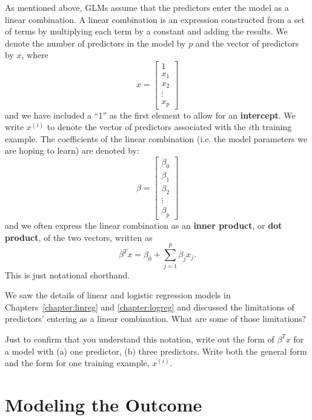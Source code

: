 As mentioned above, GLMs assume that the predictors enter the model as a linear combination. A linear combination is an expression constructed from a set of terms by multiplying each term by a constant and adding the results. We denote the number of predictors in the model by $p$ and the vector of predictors by $x$, where
$$ x = \begin{bmatrix}
1 \\
           x_{1} \\
           x_{2} \\
           \vdots \\
           x_{p}
         \end{bmatrix} $$
and we have included a ``1'' as the first element to allow for an \textbf{intercept}. We write $x^{(i)}$ to denote the vector of predictors associated with the $i$th training example. The coefficients of the linear combination (i.e. the model parameters we are hoping to learn) are denoted by:
$$ \beta = \begin{bmatrix}
\beta_0 \\
           \beta_{1} \\
           \beta_{2} \\
           \vdots \\
           \beta_{p}
         \end{bmatrix} $$
and we often express the linear combination as an \textbf{inner product}, or \textbf{dot product}, of the two vectors, written as
$$ \beta^T x = \beta_0 + \sum_{j=1}^p \beta_j x_j. $$
This is just notational shorthand. 
\vspace{3mm}

\begin{question}{}
We saw the details of linear and logistic regression models in Chapters~\ref{chapter:linreg} and \ref{chapter:logreg} and discussed the limitations of predictors' entering as a linear combination. What are some of those limitations?
\end{question}

\begin{question}{}
Just to confirm that you understand this notation, write out the form of $\beta^Tx$ for a model with (a) one predictor, (b) three predictors. Write both the general form and the form for one training example, $x^{(i)}$. 
\end{question}


\section{Modeling the Outcome}

